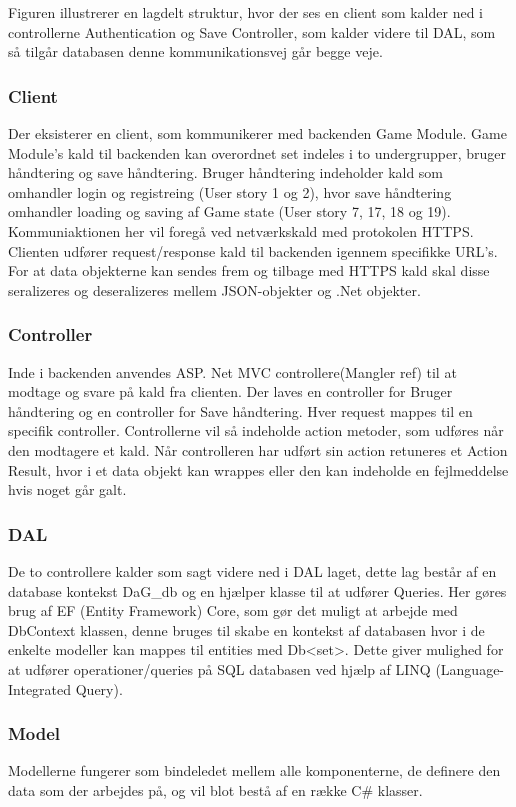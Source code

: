 Figuren illustrerer en lagdelt struktur, hvor der ses en client som kalder ned i controllerne Authentication og Save Controller, som kalder videre til DAL, som så tilgår databasen denne kommunikationsvej går begge veje.

\subsubsection{Client}
Der eksisterer en client, som kommunikerer med backenden Game Module. Game Module’s kald til backenden kan overordnet set indeles i to undergrupper, bruger håndtering og save håndtering. Bruger håndtering indeholder kald som omhandler login og registreing  (User story 1 og 2), hvor save håndtering omhandler loading og saving af Game state (User story 7, 17, 18 og 19). Kommuniaktionen her vil foregå ved netværkskald med protokolen HTTPS. Clienten udfører request/response kald til backenden igennem specifikke URL’s. For at data objekterne kan sendes frem og tilbage med HTTPS kald skal disse seralizeres og deseralizeres mellem JSON-objekter og .Net objekter.
\subsubsection{Controller}
Inde i backenden anvendes ASP. Net MVC controllere(Mangler ref)   til at modtage og svare på kald fra clienten. Der laves en controller for Bruger håndtering og en controller for Save håndtering. Hver request mappes til en specifik controller. Controllerne vil så indeholde action metoder, som udføres når den modtagere et kald. Når controlleren har udført sin action retuneres et Action Result, hvor i et data objekt kan wrappes eller den kan indeholde en fejlmeddelse hvis noget går galt.
\subsubsection{DAL}
De to controllere kalder som sagt videre ned i DAL laget, dette lag består af en database kontekst DaG\_db og en hjælper klasse til at udfører Queries. Her gøres brug af EF (Entity Framework) Core, som gør det muligt at arbejde med DbContext klassen, denne bruges til skabe en kontekst af databasen hvor i de enkelte modeller kan mappes til entities med Db<set>. Dette giver mulighed for at udfører operationer/queries på SQL databasen ved hjælp af LINQ (Language-Integrated Query).
\subsubsection{Model}
Modellerne fungerer som bindeledet mellem alle komponenterne, de definere den data som der arbejdes på, og vil blot bestå af en række C\# klasser.\\


